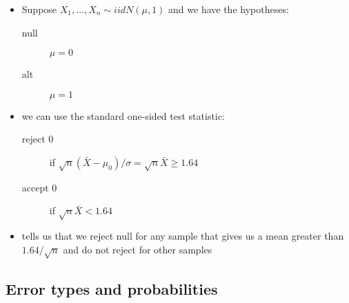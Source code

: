 \begin{itemize}
\item Suppose $X_1,\dots,X_n \sim iid N(\mu,1)$ and we have the hypotheses:
\begin{description}
\item[null] $\mu = 0$
\item[alt] $\mu = 1$
\end{description}
\item we can use the standard one-sided test statistic:
\begin{description}
\item[reject 0] if $\sqrt{n} (\bar X - \mu_0) / \sigma = \sqrt{n}
                     \bar X \geq 1.64$
\item[accept 0] if $\sqrt{n} \bar X < 1.64$
\end{description}
\item tells us that we reject null for any sample that gives us a mean
       greater than $1.64 / \sqrt{n}$ and do not reject for other
       samples
\end{itemize}

\subsection{Error types and probabilities}

